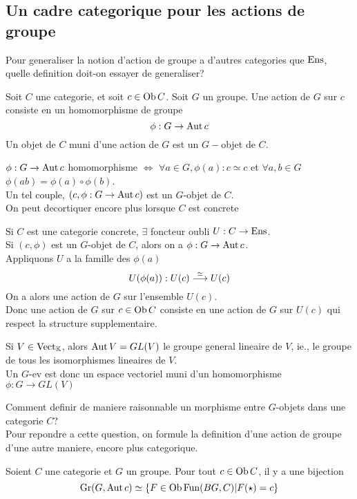 \documentclass[../main.tex]{subfiles}
\begin{document}
\subsection{Un cadre categorique pour les actions de groupe}
Pour generaliser la notion d'action de groupe a d'autres categories que $\operatorname{Ens}$, quelle definition doit-on essayer de generaliser?
\begin{defn}
	Soit $C$ une categorie, et soit $c\in \operatorname{Ob} C$. Soit $G$ un groupe. Une action de $G$ sur $c$ consiste en un homomorphisme de groupe
	\[ 
	\phi: G\to \operatorname{Aut} c
	\]	
	Un objet de $C$ muni d'une action de $G$ est un $G-$objet de $C.$ 	
\end{defn}
$\phi: G\to \operatorname{Aut} c$ homomorphisme $\iff$ $\forall a \in G, \phi( a) :c\simeq c$ et $\forall a,b\in G$ $\phi( ab) =\phi( a) \circ\phi( b) $.\\
Un tel couple, $( c,\phi: G\to \operatorname{Aut} c) $ est un $G$-objet de $C$.\\
On peut decortiquer encore plus lorsque $C$ est concrete
\begin{rmq}
Si $C$ est une categorie concrete, $\exists $ foncteur oubli $U: C\to \operatorname{Ens}$.\\
Si $( c,\phi) $ est un $G$-objet de $C$, alors on a $\phi: G\to \operatorname{Aut} c$.\\
Appliquons $U$  a la famille des $\phi( a) $ 
\[ 
U( \phi( a) ) : U( c) \overset{ \simeq}{\longrightarrow} U( c) 
\]
On a alors une action de $G$ sur l'ensemble $U( c) $.\\
Donc une action de $G$ sur $c\in \operatorname{Ob} C$ consiste en une action de $G$ sur $U( c) $ qui respect la structure supplementaire.
\end{rmq}
\begin{exemple}
Si $V\in \operatorname{Vect}_\mathbb{K}$, alors $\operatorname{Aut} V = GL( V) $ le groupe general lineaire de $V$, ie., le groupe de tous les isomorphismes lineaires de $V$. \\
Un $G$-ev est donc un espace vectoriel muni d'un homomorphisme $\phi: G \to GL( V) $ 
\end{exemple}
Comment definir de maniere raisonnable un morphisme entre $G$-objets dans une categorie $C$?\\
Pour repondre a cette question, on formule la definition d'une action de groupe d'une autre maniere, encore plus categorique.
\begin{lemma}
Soient $C$ une categorie et $G$ un groupe.  Pour tout $c\in \operatorname{Ob} C$, il y a une bijection
\[ 
\operatorname{Gr} ( G, \operatorname{Aut} c) \simeq \left\{ F\in \operatorname{Ob} \operatorname{Fun}( BG,C)| F( \star) =c  \right\} 
\]
\end{lemma}
\end{document}
